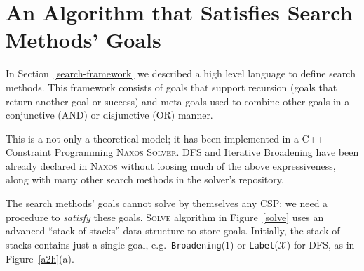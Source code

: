 \documentclass{ws-ijait}
\begin{document}




\appendix

\section{An Algorithm that Satisfies Search Methods'
         Goals\label{framework-algorithm}}

In Section~\ref{search-framework} we described a high level
language to define search methods. This framework consists
of goals that support recursion (goals that return another
goal or success) and meta-goals used to combine other goals
in a conjunctive (\textsf{AND}) or disjunctive (\textsf{OR})
manner.

This is a not only a theoretical model; it has been
implemented in a C++ Constraint Programming \textsc{Naxos
Solver}. DFS and Iterative Broadening have been already
declared in \textsc{Naxos} without loosing much of the above
expressiveness, along with many other search methods in the
solver's repository.\cite{Naxos}

The search methods' goals cannot solve by themselves any
CSP; we need a procedure to \emph{satisfy} these goals.
\textsc{Solve} algorithm in Figure~\ref{solve} uses an
advanced ``stack of stacks'' data structure to store goals.
Initially, the stack of stacks contains just a single goal,
e.g.\ \texttt{Broadening}($1$) or
\texttt{Label}($\mathscr{X}$) for DFS, as in
Figure~\ref{a2h}(a).
\end{document}
